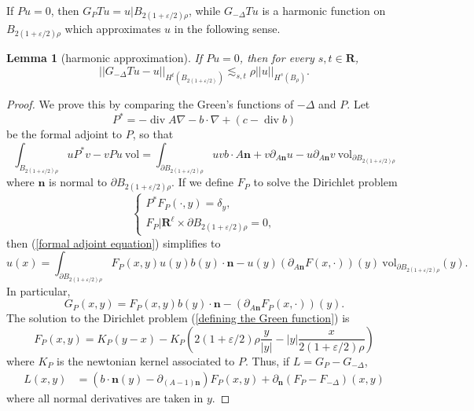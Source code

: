 \documentclass[reqno,12pt,letterpaper]{amsart}
\newcommand{\RR}{\mathbf{R}}
\DeclareMathOperator{\Div}{div}
\newcommand{\normal}{\mathbf n}
\newcommand{\vol}{\mathrm{vol}}
\newtheorem{lemma}[theorem]{Lemma}
\theoremstyle{definition}
\numberwithin{equation}{section}
\begin{document}
If $Pu = 0$, then $G_PTu = u|B_{2(1 + \varepsilon/2)\rho}$, while $G_{-\Delta}Tu$ is a harmonic function on $B_{2(1 + \varepsilon/2)\rho}$ which approximates $u$ in the following sense.

\begin{lemma}[harmonic approximation]\label{approx harmonic}
If $Pu = 0$, then for every $s, t \in \RR$,
$$||G_{-\Delta}Tu - u||_{H^t(B_{2(1 + \varepsilon/2)})} \lesssim_{s, t} \rho ||u||_{H^s(B_\rho)}.$$
\end{lemma}
\begin{proof}
We prove this by comparing the Green's functions of $-\Delta$ and $P$. Let
$$P^* = -\Div A \nabla - b \cdot \nabla + (c - \Div b)$$
be the formal adjoint to $P$, so that
\begin{equation}\label{formal adjoint equation}
\int_{B_{2(1 + \varepsilon/2)\rho}} uP^*v - vPu ~\vol = \int_{\partial B_{2(1 + \varepsilon/2)\rho}} uv b \cdot A\normal + v\partial_{A\normal} u - u\partial_{A\normal} v ~\vol_{\partial B_{2(1 + \varepsilon/2)\rho}}
\end{equation}
where $\normal$ is normal to $\partial B_{2(1 + \varepsilon/2)\rho}$.
If we define $F_P$ to solve the Dirichlet problem
\begin{equation}\label{defining the Green function}
\begin{cases}P^* F_P(\cdot, y) = \delta_y,\\
F_P|\RR^\ell \times \partial B_{2(1 + \varepsilon/2)\rho} = 0,
\end{cases}
\end{equation}
then (\ref{formal adjoint equation}) simplifies to
$$u(x) = \int_{\partial B_{2(1 + \varepsilon/2)\rho}} F_P(x, y)u(y) b(y) \cdot \normal - u(y) (\partial_{A \normal} F(x, \cdot))(y) ~\vol_{\partial B_{2(1 + \varepsilon/2)\rho}}(y).$$
In particular,
$$G_P(x, y) = F_P(x, y)b(y) \cdot \normal - (\partial_{A \normal} F_P(x, \cdot))(y).$$
The solution to the Dirichlet problem (\ref{defining the Green function}) is
$$F_P(x, y) = K_P(y - x) - K_P\left(2(1 + \varepsilon/2)\rho \frac{y}{|y|} - |y| \frac{x}{2(1 + \varepsilon/2)\rho}\right)$$
where $K_P$ is the newtonian kernel associated to $P$.
Thus, if $L = G_P - G_{-\Delta}$,
\begin{align*}
L(x, y) &= (b \cdot \normal(y) - \partial_{(A - 1)\normal})F_P(x, y) + \partial_\normal (F_P - F_{-\Delta})(x, y)
\end{align*}
where all normal derivatives are taken in $y$.


\end{proof}
\end{document}
